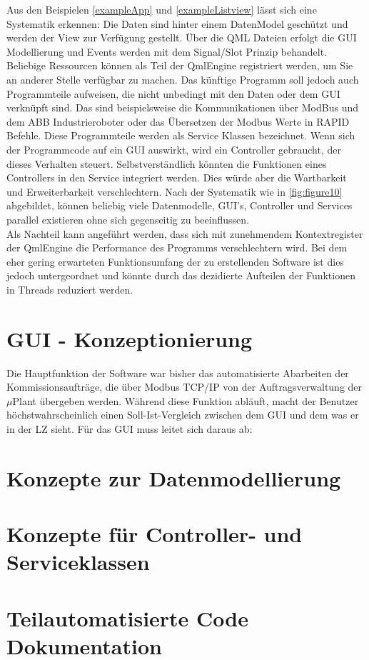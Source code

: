 Aus den Beispielen \ref{exampleApp} und \ref{exampleListview} lässt sich eine Systematik erkennen:
Die Daten sind hinter einem DatenModel geschützt und werden der View zur Verfügung gestellt.
Über die QML Dateien erfolgt die GUI Modellierung und Events werden mit dem Signal/Slot Prinzip behandelt.
Beliebige Ressourcen können als Teil der QmlEngine registriert werden, um Sie an anderer Stelle verfügbar zu machen.
Das künftige Programm soll jedoch auch Programmteile aufweisen, die nicht unbedingt mit den Daten oder dem GUI verknüpft sind.
Das sind beispielsweise die Kommunikationen über ModBus und dem ABB Industrieroboter oder das Übersetzen der Modbus Werte in
RAPID Befehle.
Diese Programmteile werden als Service Klassen bezeichnet.
Wenn sich der Programmcode auf ein GUI auswirkt, wird ein Controller gebraucht, der dieses Verhalten steuert.
Selbstverständlich könnten die Funktionen eines Controllers in den Service integriert werden.
Dies würde aber die Wartbarkeit und Erweiterbarkeit verschlechtern.
Nach der Systematik wie in \ref{fig:figure10} abgebildet, können beliebig viele Datenmodelle, GUI's, Controller und Services
parallel existieren ohne sich gegenseitig zu beeinflussen.\\
Als Nachteil kann angeführt werden, dass sich mit zunehmendem Kontextregister der QmlEngine die Performance des Programms
verschlechtern wird.
Bei dem eher gering erwarteten Funktionsumfang der zu erstellenden Software ist dies jedoch untergeordnet und könnte
durch das dezidierte Aufteilen der Funktionen in Threads reduziert werden.

\section{GUI - Konzeptionierung}

Die Hauptfunktion der Software war bisher das automatisierte Abarbeiten der Kommissionsaufträge, die über Modbus TCP/IP
von der Auftragsverwaltung der $\mu$Plant übergeben werden.
Während diese Funktion abläuft, macht der Benutzer höchstwahrscheinlich einen Soll-Ist-Vergleich zwischen dem GUI
und dem was er in der LZ sieht.
Für das GUI muss leitet sich daraus ab:

\section{Konzepte zur Datenmodellierung}

\section{Konzepte für Controller- und Serviceklassen}

\section{Teilautomatisierte Code Dokumentation}